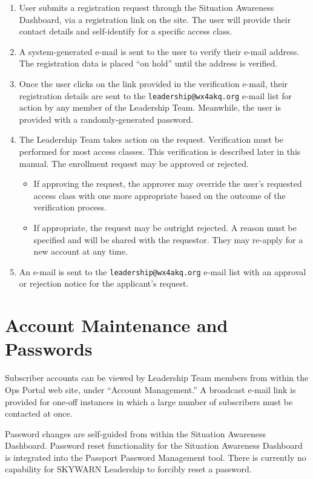 \documentclass[pdflatex,letterpaper,twoside,12pt]{book}
\begin{document}
\begin{enumerate}
\item User submits a registration request through the Situation Awareness Dashboard, via a registration link on the site.  The user will provide their contact details and self-identify for a specific access class.
\item A system-generated e-mail is sent to the user to verify their e-mail address.  The registration data is placed ``on hold'' until the address is verified.
\item Once the user clicks on the link provided in the verification e-mail, their registration details are sent to the \verb|leadership@wx4akq.org| e-mail list for action by any member of the Leadership Team.  Meanwhile, the user is provided with a randomly-generated password.
\item The Leadership Team takes action on the request.  Verification must be performed for most access classes.  This verification is described later in this manual.  The enrollment request may be approved or rejected.
\begin{itemize}
  \item If approving the request, the approver may override the user's requested access class with one more appropriate based on the outcome of the verification process.
  \item If appropriate, the request may be outright rejected.  A reason must be specified and will be shared with the requestor.  They may re-apply for a new account at any time.
  \end{itemize}
\item An e-mail is sent to the \verb|leadership@wx4akq.org| e-mail list with an approval or rejection notice for the applicant's request.
\end{enumerate}


\section{Account Maintenance and Passwords}

Subscriber accounts can be viewed by Leadership Team members from within the Ops Portal web site, under ``Account Management.''  A broadcast e-mail link is provided for one-off instances in which a large number of subscribers must be contacted at once.

Password changes are self-guided from within the Situation Awareness Dashboard.  Password reset functionality for the Situation Awareness Dashboard is integrated into the Passport Password Management tool.  There is currently no capability for SKYWARN Leadership to forcibly reset a password.
\end{document}
